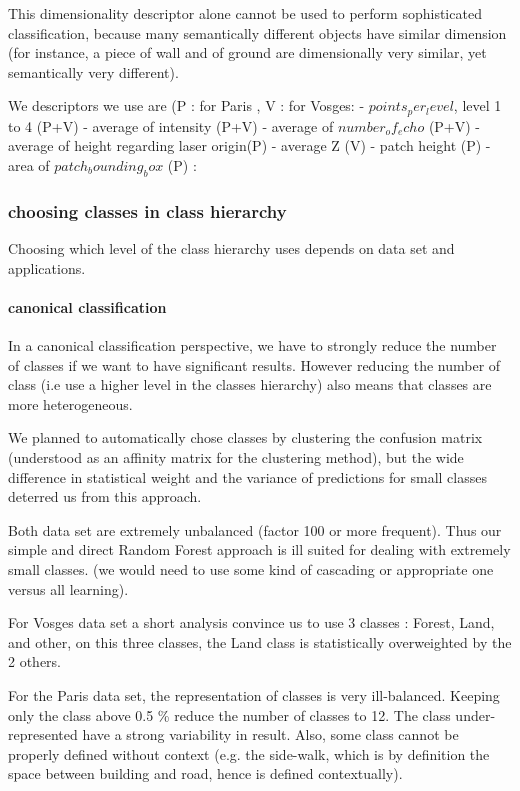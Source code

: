 			This dimensionality descriptor alone cannot be used to perform sophisticated classification, because many semantically different objects have similar dimension (for instance, a piece of wall and of ground are dimensionally very similar, yet semantically very different).
						
			We descriptors we use are (P : for Paris , V : for Vosges: 
			  - $points_per_level$, level 1 to 4 (P+V)
			  - average of intensity (P+V)
			  - average of $number_of_echo$ (P+V)
			  - average of height regarding laser origin(P)
			  - average Z (V)
			  - patch height (P)
			  - area of $patch_bounding_box$ (P) : 
			 
		\subsubsection{choosing classes in class hierarchy}
			Choosing which level of the class hierarchy uses depends on data set and applications.
			
			\paragraph{canonical classification}
			
				In a canonical classification perspective, we have to strongly reduce the number of classes if we want to have significant results.
				However reducing the number of class (i.e use a higher level in the classes hierarchy) also means that classes are more heterogeneous.
				
				We planned to automatically chose classes by clustering the confusion matrix (understood as an affinity matrix for the clustering method), but the wide difference in statistical weight and the variance of predictions for small classes deterred us from this approach.
				
				Both data set are extremely unbalanced (factor 100 or more frequent). Thus our simple and direct Random Forest approach is ill suited for dealing with extremely small classes. (we would need to use some kind of cascading or appropriate one versus all learning).
				
				For Vosges data set a short analysis convince us to use 3 classes : Forest, Land, and other, on this three classes, the Land class is statistically overweighted by the 2 others.	
			
				For the Paris data set, the representation of classes is very ill-balanced.
				Keeping only the class above 0.5 \% reduce the number of classes to 12.
				The class under-represented have a strong variability in result.
				Also, some class cannot be properly defined without context (e.g. the side-walk, which is by definition the space between building and road, hence is defined contextually).
		 	
